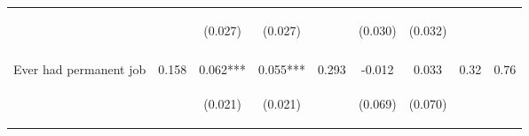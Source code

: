 \begin{table}[h!]
{\begin{tabular}{lcccccccc}
 & \begin{footnotesize}\end{footnotesize} & \begin{footnotesize}(0.027)\end{footnotesize} & \begin{footnotesize}(0.027)\end{footnotesize} & \begin{footnotesize}\end{footnotesize} & \begin{footnotesize}(0.030)\end{footnotesize} & \begin{footnotesize}(0.032)\end{footnotesize} & \begin{footnotesize}\end{footnotesize} & \begin{footnotesize}\end{footnotesize}\\
 & \begin{footnotesize}\end{footnotesize} & \begin{footnotesize}[0.021]\end{footnotesize} & \begin{footnotesize}[0.021]\end{footnotesize} & \begin{footnotesize}\end{footnotesize} & \begin{footnotesize}[0.505]\end{footnotesize} & \begin{footnotesize}[0.410]\end{footnotesize} & \begin{footnotesize}\end{footnotesize} & \begin{footnotesize}\end{footnotesize}\\
\noalign{\smallskip}Ever had permanent job & 0.158 & 0.062*** & 0.055*** & 0.293 & -0.012 & 0.033 & 0.32 & 0.76\\
 & \begin{footnotesize}\end{footnotesize} & \begin{footnotesize}(0.021)\end{footnotesize} & \begin{footnotesize}(0.021)\end{footnotesize} & \begin{footnotesize}\end{footnotesize} & \begin{footnotesize}(0.069)\end{footnotesize} & \begin{footnotesize}(0.070)\end{footnotesize} & \begin{footnotesize}\end{footnotesize} & \begin{footnotesize}\end{footnotesize}\\

\end{tabular}}
\end{table}
